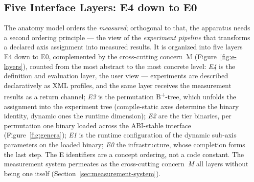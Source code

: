 \begin{nurkurz}
\subsection{Five Interface Layers: E4 down to E0}\label{sec:anatomy-layers}
The anatomy model orders the \emph{measured}; orthogonal to that, the apparatus needs a second ordering
principle --- the view of the \emph{experiment pipeline} that transforms a declared axis assignment into
measured results. It is organized into five layers E4 down to E0, complemented by the cross-cutting
concern~M (Figure~\ref{fig:e-layers}), counted from the most abstract to the most concrete level:
\emph{E4} is the definition and evaluation layer, the user view --- experiments are described
declaratively as XML profiles, and the same layer receives the measurement results as a return channel;
\emph{E3} is the permutation B\textsuperscript{+}-tree, which unfolds the assignment into the experiment
tree (compile-static axes determine the binary identity, dynamic ones the runtime dimension); \emph{E2}
are the tier binaries, per permutation one binary loaded across the ABI-stable interface
(Figure~\ref{fig:genera}); \emph{E1} is the runtime configuration of the dynamic sub-axis parameters on
the loaded binary; \emph{E0} the infrastructure, whose completion forms the last step. The E identifiers
are a concept ordering, not a code constant. The measurement system permeates as the cross-cutting
concern~\emph{M} all layers without being one itself (Section~\ref{sec:measurement-system}).
\end{nurkurz}

